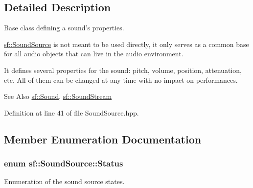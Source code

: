 \subsection{Detailed Description}
Base class defining a sound's properties. 

\hyperlink{classsf_1_1_sound_source}{sf\-::\-Sound\-Source} is not meant to be used directly, it only serves as a common base for all audio objects that can live in the audio environment.

It defines several properties for the sound\-: pitch, volume, position, attenuation, etc. All of them can be changed at any time with no impact on performances.

\begin{DoxySeeAlso}{See Also}
\hyperlink{classsf_1_1_sound}{sf\-::\-Sound}, \hyperlink{classsf_1_1_sound_stream}{sf\-::\-Sound\-Stream} 
\end{DoxySeeAlso}


Definition at line 41 of file Sound\-Source.\-hpp.



\subsection{Member Enumeration Documentation}
\hypertarget{classsf_1_1_sound_source_ac43af72c98c077500b239bc75b812f03}{
\subsubsection[{Status}]{\setlength{\rightskip}{0pt plus 5cm}enum {\bf sf\-::\-Sound\-Source\-::\-Status}}}\label{classsf_1_1_sound_source_ac43af72c98c077500b239bc75b812f03}


Enumeration of the sound source states. 

